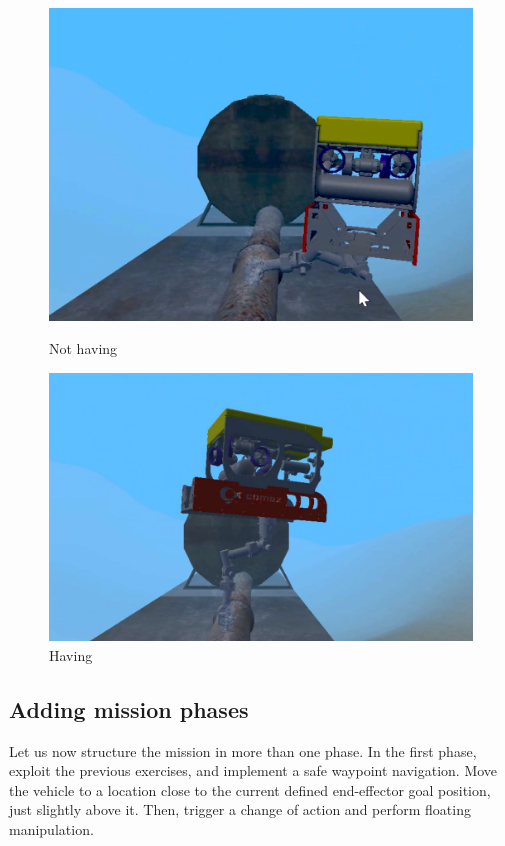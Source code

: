 \documentclass{article}
\begin{document}
\begin{figure}[htp]
    \centering
    \begin{minipage}{0.50\textwidth}
    \includegraphics[scale=0.37]{513_comment.png}
    \caption{Not having}
    \end{minipage}
\hfill
    \centering
    \begin{minipage}{0.50\textwidth}
    \includegraphics[scale=0.3]{513_uncomment.png}
    \caption{Having}
    \end{minipage}
\end{figure}

\clearpage

\subsection{Adding mission phases}
Let us now structure the mission in more than one phase. In the first phase, exploit the previous exercises, and implement a safe waypoint navigation. Move the vehicle to a location close to the current defined end-effector goal position, just slightly above it. Then, trigger a change of action and perform floating manipulation.
\end{document}
